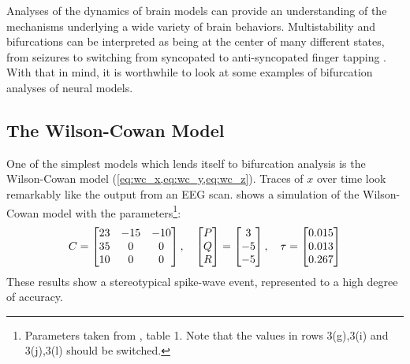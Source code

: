 Analyses of the dynamics of brain models can provide an understanding of the mechanisms underlying a wide variety of brain behaviors.
Multistability and bifurcations can be interpreted as being at the center of many different states, from seizures to switching from syncopated to anti-syncopated finger tapping \cite{Wang2012,Jirsa2014,Santos2017,Baier2012,Breakspear2005,Jirsa2014,Breakspear2017}.
With that in mind, it is worthwhile to look at some examples of bifurcation analyses of neural models.
\subsection{The Wilson-Cowan Model}
\label{sec:lit_review_bifurcation_wc}
One of the simplest models which lends itself to bifurcation analysis is the Wilson-Cowan model (\cref{eq:wc_x,eq:wc_y,eq:wc_z}).
Traces of $x$ over time look remarkably like the output from an EEG scan.
 shows a simulation of the Wilson-Cowan model with the parameters\footnote{Parameters taken from \cite{Wang2012}, table 1.  Note that the values in rows 3(g),3(i) and 3(j),3(l) should be switched.}:
\begin{equation}
  \label{eq:wc_params}
  C
  =
  \bmqty{23 & -15 & -10 \\ 35 & 0 & 0 \\ 10 & 0 & 0}
  \qc
  \bmqty{P \\ Q \\ R}
  =
  \bmqty{3 \\ -5 \\ -5}
  \qc
  \tau
  =
  \bmqty{0.015 \\ 0.013 \\ 0.267}
\end{equation}
These results show a stereotypical spike-wave event, represented to a high degree of accuracy.
